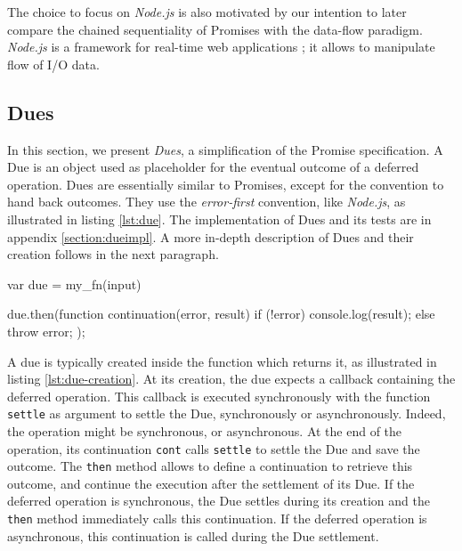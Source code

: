 The choice to focus on \textit{Node.js} is also motivated by our intention to later compare the chained sequentiality of Promises with the data-flow paradigm.
\textit{Node.js} is a framework for real-time web applications ; it allows to manipulate flow of I/O data.


\subsection{Dues} \label{section:due}

In this section, we present \textit{Dues}, a simplification of the Promise specification.
A Due is an object used as placeholder for the eventual outcome of a deferred operation.
Dues are essentially similar to Promises, except for the convention to hand back outcomes.
They use the \textit{error-first} convention, like \textit{Node.js}, as illustrated in listing \ref{lst:due}.
The implementation of Dues and its tests are in appendix \ref{section:dueimpl}.
A more in-depth description of Dues and their creation follows in the next paragraph.

\begin{code}[js, %
             caption={Example of a due}, %
             label={lst:due}] %
var due = my_fn(input)

due.then(function continuation(error, result) {
  if (!error) {
    console.log(result);
  } else {
    throw error;
  }
});
\end{code}

A due is typically created inside the function which returns it, as illustrated in listing \ref{lst:due-creation}.
At its creation, the due expects a callback containing the deferred operation.
This callback is executed synchronously with the function \texttt{settle} as argument to settle the Due, synchronously or asynchronously.
Indeed, the operation might be synchronous, or asynchronous.
At the end of the operation, its continuation \texttt{cont} calls \texttt{settle} to settle the Due and save the outcome.
The \texttt{then} method allows to define a continuation to retrieve this outcome, and continue the execution after the settlement of its Due.
If the deferred operation is synchronous, the Due settles during its creation and the \texttt{then} method immediately calls this continuation.
If the deferred operation is asynchronous, this continuation is called during the Due settlement.


